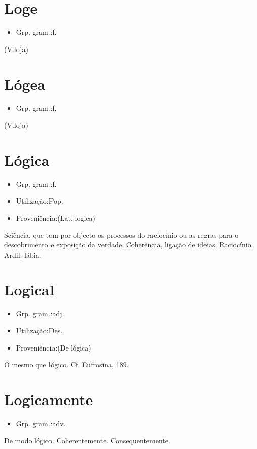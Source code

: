 \section{Loge}
\begin{itemize}
\item {Grp. gram.:f.}
\end{itemize}
(V.loja)
\section{Lógea}
\begin{itemize}
\item {Grp. gram.:f.}
\end{itemize}
(V.loja)
\section{Lógica}
\begin{itemize}
\item {Grp. gram.:f.}
\end{itemize}
\begin{itemize}
\item {Utilização:Pop.}
\end{itemize}
\begin{itemize}
\item {Proveniência:(Lat. \textunderscore logica\textunderscore )}
\end{itemize}
Sciência, que tem por objecto os processos do raciocínio ou as regras para o descobrimento e exposição da verdade.
Coherência, ligação de ideias.
Raciocínio.
Ardil; lábia.
\section{Logical}
\begin{itemize}
\item {Grp. gram.:adj.}
\end{itemize}
\begin{itemize}
\item {Utilização:Des.}
\end{itemize}
\begin{itemize}
\item {Proveniência:(De \textunderscore lógica\textunderscore )}
\end{itemize}
O mesmo que \textunderscore lógico\textunderscore . Cf. \textunderscore Eufrosina\textunderscore , 189.
\section{Logicamente}
\begin{itemize}
\item {Grp. gram.:adv.}
\end{itemize}
De modo lógico.
Coherentemente.
Consequentemente.
